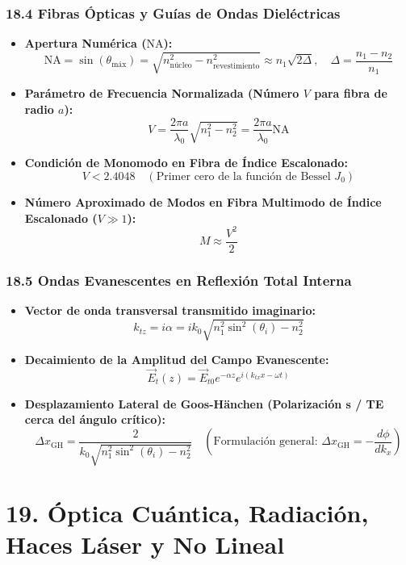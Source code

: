 \documentclass[11pt,a4paper]{article}
\begin{document}
\subsubsection*{18.4 Fibras Ópticas y Guías de Ondas Dieléctricas}

\begin{itemize}
  \item \textbf{Apertura Numérica ($\text{NA}$):}
  \[
    \text{NA} = \sin(\theta_{\text{máx}}) = \sqrt{n_{\text{núcleo}}^2 - n_{\text{revestimiento}}^2} \approx n_1 \sqrt{2\Delta}, \quad \Delta = \frac{n_1 - n_2}{n_1}
  \]
  \item \textbf{Parámetro de Frecuencia Normalizada (Número $V$ para fibra de radio $a$):}
  \[
    V = \frac{2\pi a}{\lambda_0} \sqrt{n_1^2 - n_2^2} = \frac{2\pi a}{\lambda_0} \text{NA}
  \]
  \item \textbf{Condición de Monomodo en Fibra de Índice Escalonado:}
  \[
    V < 2.4048 \quad (\text{Primer cero de la función de Bessel } J_0)
  \]
  \item \textbf{Número Aproximado de Modos en Fibra Multimodo de Índice Escalonado ($V \gg 1$):}
  \[
    M \approx \frac{V^2}{2}
  \]
\end{itemize}

\subsubsection*{18.5 Ondas Evanescentes en Reflexión Total Interna}

\begin{itemize}
  \item \textbf{Vector de onda transversal transmitido imaginario:}
  \[
    k_{tz} = i \alpha = i k_0 \sqrt{n_1^2 \sin^2(\theta_i) - n_2^2}
  \]
  \item \textbf{Decaimiento de la Amplitud del Campo Evanescente:}
  \[
    \vec{E}_t(z) = \vec{E}_{t0} e^{-\alpha z} e^{i(k_{tx} x - \omega t)}
  \]
  \item \textbf{Desplazamiento Lateral de Goos-Hänchen (Polarización s / TE cerca del ángulo crítico):}
  \[
    \Delta x_{\text{GH}} = \frac{2}{k_0 \sqrt{n_1^2 \sin^2(\theta_i) - n_2^2}} \quad \left( \text{Formulación general: } \Delta x_{\text{GH}} = -\frac{d\phi}{dk_x} \right)
  \]
\end{itemize}

\section*{19. Óptica Cuántica, Radiación, Haces Láser y No Lineal}
\end{document}
